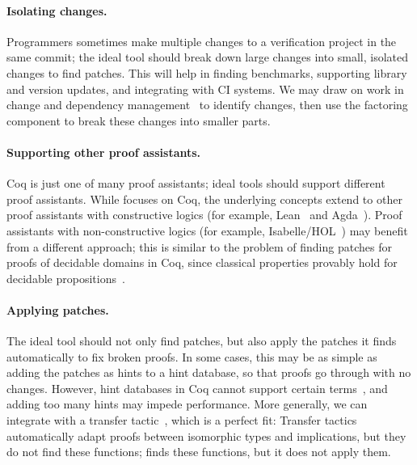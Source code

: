 \paragraph{Isolating changes.} Programmers sometimes make multiple changes to a verification project in the same commit;
the ideal tool should break down large changes into small, isolated changes to find patches.
This will help in finding benchmarks, supporting library and version updates, and integrating
with CI systems. We may draw on work in change and dependency management~\cite{873647, Autexier:2010:CMH:1986659.1986663, Celik:2017:IRP:3155562.3155588} to identify changes, then use the factoring component
to break these changes into smaller parts.

\paragraph{Supporting other proof assistants.} Coq is just one of many proof assistants;
ideal tools should support different proof assistants. While
\sysname focuses on Coq, the underlying concepts extend to other proof assistants with constructive
logics (for example, Lean~\cite{lean} and Agda~\cite{agda}).
Proof assistants with non-constructive logics (for example, Isabelle/HOL~\cite{isabellehol})
may benefit from a different approach; this is similar to the problem of finding patches for proofs of decidable domains in Coq, 
since classical properties provably hold for decidable propositions~\cite{decidable}.

\paragraph{Applying patches.} The ideal tool should not only find patches, but also apply the
patches it finds automatically to fix broken proofs. 
In some cases, this may be as simple as adding the patches as hints to a hint database, so that proofs go through with no changes.
However, hint databases in Coq cannot support certain terms~\cite{hints}, and adding too many
hints may impede performance.
More generally, we can integrate \sysname with a transfer tactic~\cite{Huffman2013, zimmermann2015automatic},
which is a perfect fit: 
Transfer tactics automatically adapt proofs between isomorphic types and implications, but they do
not find these functions; \sysname finds these functions, but it does not apply them.





